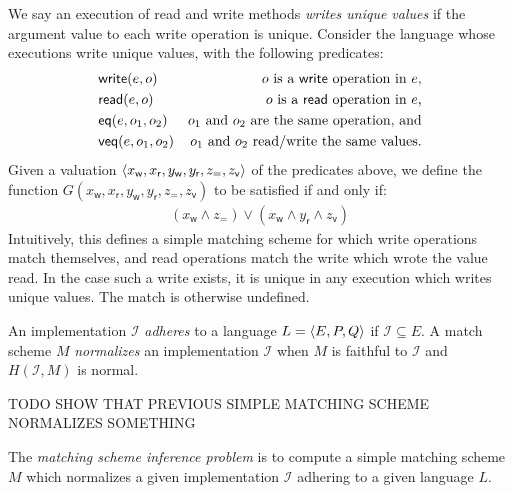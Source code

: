 \begin{example}

  We say an execution of read and write methods \emph{writes unique values} if
  the argument value to each write operation is unique. Consider the language
  whose executions write unique values, with the following predicates:
  \begin{align*}
    & \mathsf{write}(e,o) & \text{$o$ is a {\sf write} operation in $e$}, \\
    & \mathsf{read}(e,o) & \text{$o$ is a {\sf read} operation in $e$,} \\
    & \mathsf{eq}(e,o_1,o_2) & \text{$o_1$ and $o_2$ are the same operation, and} \\
    & \mathsf{veq}(e,o_1,o_2) & \text{$o_1$ and $o_2$ read/write the same values.}
  \end{align*}
  Given a valuation ${\left\langle{x_\mathsf{w}, x_\mathsf{r}, y_\mathsf{w},
  y_\mathsf{r}, z_\mathsf{=}, z_\mathsf{v}}\right\rangle}$ of the predicates above, we define
  the function $G(x_\mathsf{w}, x_\mathsf{r}, y_\mathsf{w}, y_\mathsf{r},
  z_\mathsf{=}, z_\mathsf{v})$ to be satisfied if and only if:
  \begin{align*}
    ( x_\mathsf{w} \land z_\mathsf{=} )
    \lor ( x_\mathsf{w} \land y_\mathsf{r} \land z_\mathsf{v} )
  \end{align*}
  Intuitively, this defines a simple matching scheme for which write
  operations match themselves, and read operations match the write which wrote
  the value read. In the case such a write exists, it is unique in any
  execution which writes unique values. The match is otherwise undefined.

\end{example}

An implementation $\mathcal{I}$ \emph{adheres} to a language $L = {\left\langle{E,P,Q}\right\rangle}$
if $\mathcal{I} \subseteq E$. A match scheme $M$ \emph{normalizes} an
implementation $\mathcal{I}$ when $M$ is faithful to $\mathcal{I}$ and
$H(\mathcal{I},M)$ is normal.

\begin{example}

  TODO SHOW THAT PREVIOUS SIMPLE MATCHING SCHEME NORMALIZES SOMETHING

\end{example}

\begin{definition}

  The \emph{matching scheme inference problem} is to compute a simple matching
  scheme $M$ which normalizes a given implementation $\mathcal{I}$ adhering to
  a given language $L$.

\end{definition}

